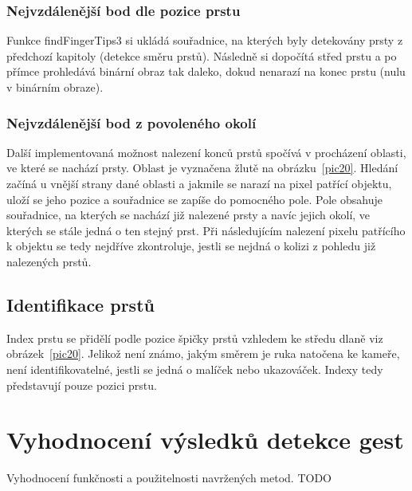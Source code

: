 \subsubsection{Nejvzdálenější bod dle pozice prstu}
Funkce findFingerTips3 si ukládá souřadnice, na kterých byly detekovány prsty z předchozí kapitoly (detekce směru prstů). Následně si dopočítá střed prstu a po přímce prohledává binární obraz tak daleko, dokud nenarazí na konec prstu (nulu v binárním obraze). 

\subsubsection{Nejvzdálenější bod z povoleného okolí}
Další implementovaná možnost nalezení konců prstů spočívá v procházení oblasti, ve které se nachází prsty. Oblast je vyznačena žlutě na obrázku~\ref{pic20}. Hledání začíná u vnější strany dané oblasti a jakmile se narazí na pixel patřící objektu, uloží se jeho pozice a souřadnice se zapíše do pomocného pole. Pole obsahuje souřadnice, na kterých se nachází již nalezené prsty a navíc jejich okolí, ve kterých se stále jedná o ten stejný prst. Při následujícím nalezení pixelu patřícího k objektu se tedy nejdříve zkontroluje, jestli se nejdná o kolizi z pohledu již nalezených prstů.

\subsection{Identifikace prstů}
Index prstu se přidělí podle pozice špičky prstů vzhledem ke středu dlaně viz obrázek~\ref{pic20}. Jelikož není známo, jakým směrem je ruka natočena ke kameře, není identifikovatelné, jestli se jedná o malíček nebo ukazováček. Indexy tedy představují pouze pozici prstu.

\section{Vyhodnocení výsledků detekce gest}
Vyhodnocení funkčnosti a použitelnosti navržených metod.
TODO

\endinput
